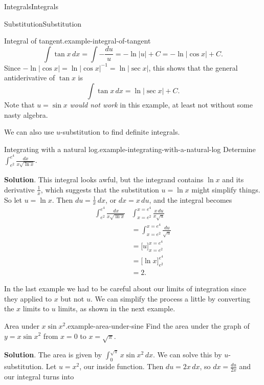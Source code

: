 \documentclass[10pt,]{book}
\numberwithin{equation}{section}
\begin{document}
\begin{chapterptx}{Integrals}{}{Integrals}{}{}
\begin{sectionptx}{Substitution}{}{Substitution}{}{}
\begin{example}{Integral of tangent.}{example-integral-of-tangent}
\begin{equation*}
\int\tan x\,dx = \int-\frac{du}{u} = -\ln|u| + C = -\ln|\cos x|+C.
\end{equation*}
Since \(-\ln|\cos x| = \ln|\cos x|^{-1} = \ln|\sec x|\), this shows that the general antiderivative of \(\tan x\) is%
\begin{equation*}
\int \tan x\,dx = \ln|\sec x| + C.
\end{equation*}
Note that \(u = \sin x\) \emph{would not work} in this example, at least not without some nasty algebra.%
\end{example}
\hypertarget{p-488}{}%
We can also use \(u\)-substitution to find definite integrals.%
\begin{example}{Integrating with a natural log.}{example-integrating-with-a-natural-log}%
\hypertarget{p-489}{}%
Determine \(\int_{e^{2}}^{e^{4}}\frac{dx}{x\sqrt{\ln x}}\).%
\par\smallskip%
\noindent\textbf{Solution}.\hypertarget{solution-108}{}\quad%
\hypertarget{p-490}{}%
This integral looks awful, but the integrand contains \(\ln x\) and its derivative \(\frac{1}{x}\), which suggests that the substitution \(u = \ln x\) might simplify things. So let \(u = \ln x\). Then \(du = \frac{1}{x}\,dx\), or \(dx = x\,du\), and the integral becomes%
\begin{align*}
\int_{e^{2}}^{e^{4}}\frac{dx}{x\sqrt{\ln x}} & \int_{x=e^{2}}^{x=e^{4}}\frac{x\,du}{x\sqrt{u}} \\
& = \int_{x=e^{2}}^{x=e^{4}}\frac{du}{\sqrt{u}} \\
& = \Big[u\Big]_{x=e^{2}}^{x=e^{4}} \\
& = \Big[\ln x\Big]_{e^{2}}^{e^{4}} \\
& = 2. 
\end{align*}
%
\end{example}
\hypertarget{p-491}{}%
In the last example we had to be careful about our limits of integration since they applied to \(x\) but not \(u\). We can simplify the process a little by converting the \(x\) limits to \(u\) limits, as shown in the next example.%
\begin{example}{Area under \(x\sin x^{2}\).}{example-area-under-sine}%
\hypertarget{p-492}{}%
Find the area under the graph of \(y = x\sin x^{2}\) from \(x=0\) to \(x = \sqrt{\pi}\).%
\par\smallskip%
\noindent\textbf{Solution}.\hypertarget{solution-109}{}\quad%
\hypertarget{p-493}{}%
The area is given by \(\int_{0}^{\sqrt{\pi}}x\sin x^{2}\,dx\). We can solve this by \(u\)-substitution. Let \(u = x^{2}\), our inside function. Then \(du = 2x\,dx\), so \(dx = \frac{du}{2x}\) and our integral turns into%

\end{example}
\end{sectionptx}
\end{chapterptx}
\end{document}

